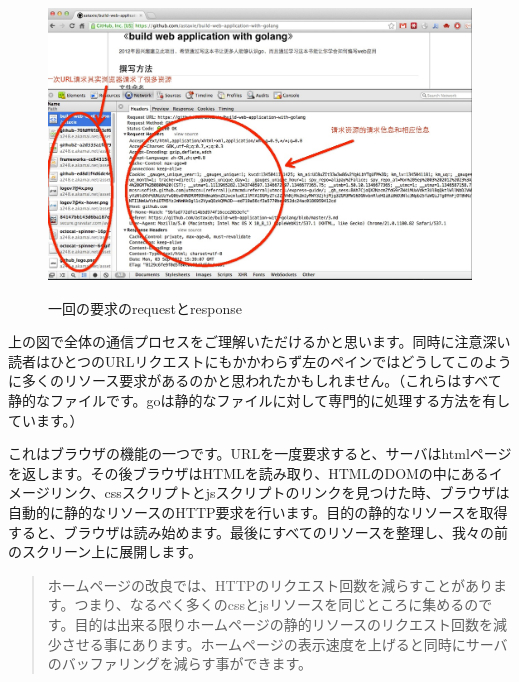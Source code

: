 \begin{figure}[H]
  \includegraphics[width=14cm]{3.1.web.jpg}
   \label{図3.7}
   \caption{一回の要求のrequestとresponse}
\end{figure}



上の図で全体の通信プロセスをご理解いただけるかと思います。同時に注意深い読者はひとつのURLリクエストにもかかわらず左のペインではどうしてこのように多くのリソース要求があるのかと思われたかもしれません。（これらはすべて静的なファイルです。goは静的なファイルに対して専門的に処理する方法を有しています。）

これはブラウザの機能の一つです。URLを一度要求すると、サーバはhtmlページを返します。その後ブラウザはHTMLを読み取り、HTMLのDOMの中にあるイメージリンク、cssスクリプトとjsスクリプトのリンクを見つけた時、ブラウザは自動的に静的なリソースのHTTP要求を行います。目的の静的なリソースを取得すると、ブラウザは読み始めます。最後にすべてのリソースを整理し、我々の前のスクリーン上に展開します。

\begin{quote}
ホームページの改良では、HTTPのリクエスト回数を減らすことがあります。つまり、なるべく多くのcssとjsリソースを同じところに集めるのです。目的は出来る限りホームページの静的リソースのリクエスト回数を減少させる事にあります。ホームページの表示速度を上げると同時にサーバのバッファリングを減らす事ができます。
\end{quote}
